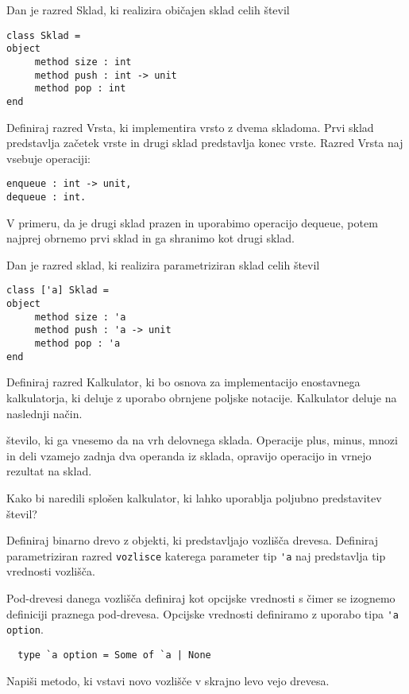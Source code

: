\begin{ex}
Dan je razred Sklad, ki realizira obi\v cajen sklad celih \v stevil

\begin{lstlisting}
class Sklad =
object 
     method size : int
     method push : int -> unit
     method pop : int
end

\end{lstlisting}
Definiraj razred Vrsta, ki implementira vrsto z dvema skladoma. Prvi sklad predstavlja za\v cetek vrste in drugi sklad predstavlja konec vrste. Razred Vrsta naj vsebuje operaciji: 

\begin{lstlisting}
enqueue : int -> unit, 
dequeue : int. 

\end{lstlisting}
V primeru, da je drugi sklad prazen in uporabimo operacijo dequeue, potem najprej obrnemo prvi sklad in ga shranimo kot drugi sklad.



\end{ex}
\begin{ex}
Dan je razred sklad, ki realizira parametriziran sklad celih \v stevil
\begin{lstlisting}
class ['a] Sklad =
object 
     method size : 'a
     method push : 'a -> unit
     method pop : 'a
end
\end{lstlisting}
Definiraj razred Kalkulator, ki bo osnova za implementacijo enostavnega kalkulatorja, ki deluje z uporabo obrnjene poljske notacije. Kalkulator deluje na naslednji na\v cin.  

\v stevilo, ki ga vnesemo da na vrh delovnega sklada. Operacije plus, minus, mnozi in deli vzamejo zadnja dva operanda iz sklada, opravijo operacijo in vrnejo rezultat na sklad. 

Kako bi naredili splo\v sen kalkulator, ki lahko uporablja poljubno predstavitev \v stevil?


\end{ex} 
\begin{ex}
  Definiraj binarno drevo z objekti, ki predstavljajo vozli\v s\v
  ca drevesa. Definiraj parametriziran razred \lstinline{vozlisce}
  katerega parameter tip \lstinline{'a} naj predstavlja tip vrednosti
  vozli\v s\v ca.

  Pod-drevesi danega vozli\v s\v ca definiraj kot opcijske vrednosti s
  \v cimer se izognemo definiciji praznega pod-drevesa. Opcijske
  vrednosti definiramo z uporabo tipa \lstinline{'a option}.

  \begin{lstlisting}
  type `a option = Some of `a | None
  \end{lstlisting}

  Napi\v si metodo, ki vstavi novo vozli\v s\v ce v skrajno levo vejo
  drevesa.

 
\end{ex} 
